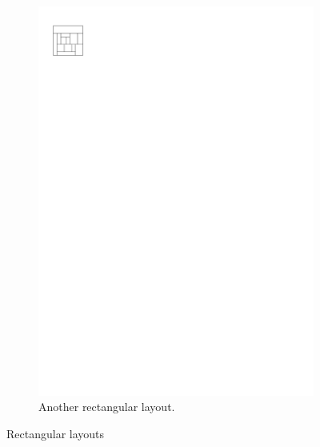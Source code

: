 \begin{figure}[h]
\begin{subfigure}[b]{0.45 \textwidth}
        \includegraphics[scale=1]{rectangularDuals/img/vertonesided}
        \caption{Another rectangular layout.}
        \label{fig:intr:vertonesided}
      \end{subfigure}
      \caption{Rectangular layouts}
      \label{fig:intr:graphs}
  \end{figure}
